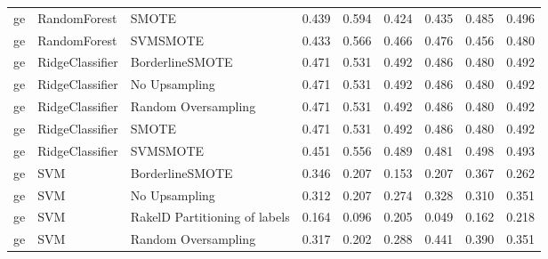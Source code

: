 \begin{tabular}{lllllllll}
      ge &                    RandomForest &                         SMOTE & 0.439 &                     0.594 &                 0.424 &                  0.435 &                                   0.485 &     0.496 \\
      ge &                    RandomForest &                      SVMSMOTE & 0.433 &                     0.566 &                 0.466 &                  0.476 &                                   0.456 &     0.480 \\
      ge &                 RidgeClassifier &               BorderlineSMOTE & 0.471 &                     0.531 &                 0.492 &                  0.486 &                                   0.480 &     0.492 \\
      ge &                 RidgeClassifier &                 No Upsampling & 0.471 &                     0.531 &                 0.492 &                  0.486 &                                   0.480 &     0.492 \\
      ge &                 RidgeClassifier &           Random Oversampling & 0.471 &                     0.531 &                 0.492 &                  0.486 &                                   0.480 &     0.492 \\
      ge &                 RidgeClassifier &                         SMOTE & 0.471 &                     0.531 &                 0.492 &                  0.486 &                                   0.480 &     0.492 \\
      ge &                 RidgeClassifier &                      SVMSMOTE & 0.451 &                     0.556 &                 0.489 &                  0.481 &                                   0.498 &     0.493 \\
      ge &                             SVM &               BorderlineSMOTE & 0.346 &                     0.207 &                 0.153 &                  0.207 &                                   0.367 &     0.262 \\
      ge &                             SVM &                 No Upsampling & 0.312 &                     0.207 &                 0.274 &                  0.328 &                                   0.310 &     0.351 \\
      ge &                             SVM & RakelD Partitioning of labels & 0.164 &                     0.096 &                 0.205 &                  0.049 &                                   0.162 &     0.218 \\
      ge &                             SVM &           Random Oversampling & 0.317 &                     0.202 &                 0.288 &                  0.441 &                                   0.390 &     0.351 \\

\end{tabular}
